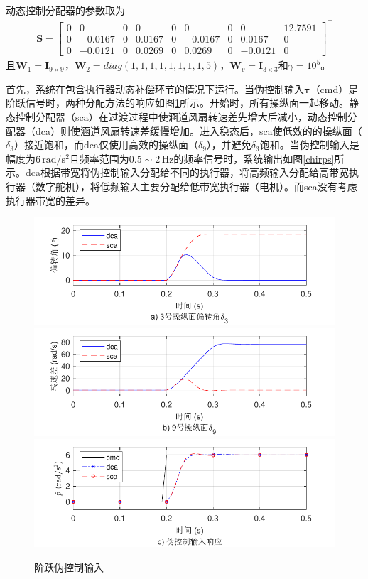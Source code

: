 动态控制分配器的参数取为
\begin{align}
\bm{S} = \left[ {\begin{array}{*{20}{c}}
	0&0&0&0&0&0&0&0&12.7591 \\ 
	0&{ - 0.0167}&0&{ 0.0167}&0&{ - 0.0167}&0&{ 0.0167}&0 \\ 
	0&{ - 0.0121}&0&{ 0.0269}&0&{ 0.0269}&0&{ - 0.0121}&0 
	\end{array}} \right]^\top
\end{align}
且$ \bm{W}_1 = \bm{I}_{9 \times 9}$，$\bm{W}_{2}={diag}(1,1,1,1,1,1,1,1,5)$，$ \bm{W}_v = \bm{I}_{3 \times 3} $和$\gamma =10^5$。

首先，系统在包含执行器动态补偿环节的情况下运行。当伪控制输入$ \bm{\tau} $（cmd）是阶跃信号时，两种分配方法的响应如图\ref {step}所示。开始时，所有操纵面一起移动。静态控制分配器（sca）在过渡过程中使涵道风扇转速差先增大后减小，动态控制分配器（dca）则使涵道风扇转速差缓慢增加。进入稳态后，sca使低效的的操纵面（$ \delta_3 $）接近饱和，而dca仅使用高效的操纵面（$ \delta_9 $），并避免$ \delta_3 $饱和。当伪控制输入是幅度为$6\,{\text{rad}}/{{{\text{s}}^{2}}}$且频率范围为$0.5 \sim 2\,\text{Hz}$的频率信号时，系统输出如图\ref{chirps}所示。dca根据带宽将伪控制输入分配给不同的执行器，将高频输入分配给高带宽执行器（数字舵机），将低频输入主要分配给低带宽执行器（电机）。而sca没有考虑执行器带宽的差异。
\begin{figure}[htbp]
	\centering	
	\includegraphics[scale=1]{Fig/TDF_step_response_a.pdf}
	\includegraphics[scale=1]{Fig/TDF_step_response_b.pdf}
	\includegraphics[scale=1]{Fig/TDF_step_response_c.pdf}
	\caption{\label{step}阶跃伪控制输入}
\end{figure}
